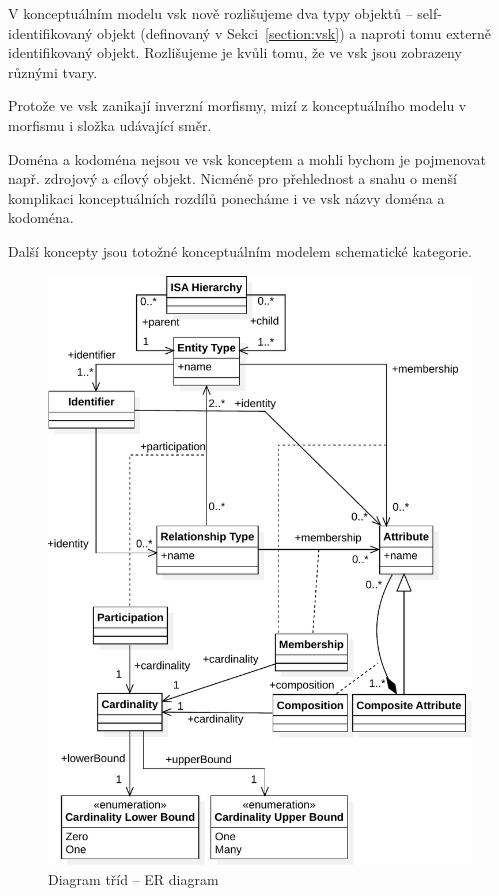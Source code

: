 V konceptuálním modelu \acrshort{vsk} nově rozlišujeme dva typy objektů -- self-identifikovaný objekt (definovaný v Sekci~\ref{section:vsk}) a naproti tomu externě identifikovaný objekt.
Rozlišujeme je kvůli tomu, že ve \acrshort{vsk} jsou zobrazeny různými tvary.

Protože ve \acrshort{vsk} zanikají inverzní morfismy, mizí z konceptuálního modelu v morfismu i složka udávající směr.

Doména a kodoména nejsou ve \acrshort{vsk} konceptem a mohli bychom je pojmenovat např. zdrojový a cílový objekt.
Nicméně pro přehlednost a snahu o menší komplikaci konceptuálních rozdílů ponecháme i ve \acrshort{vsk} názvy doména a kodoména.

Další koncepty jsou totožné konceptuálním modelem schematické kategorie.

\begin{figure}[!htb]
  \centering
  \includegraphics[width=\maxwidth{\textwidth}]{../img/diagrams/er-diagram-model.pdf}
  \caption{Diagram tříd -- ER diagram}
  \label{fig:class-diagram:er-diagram}
\end{figure}
